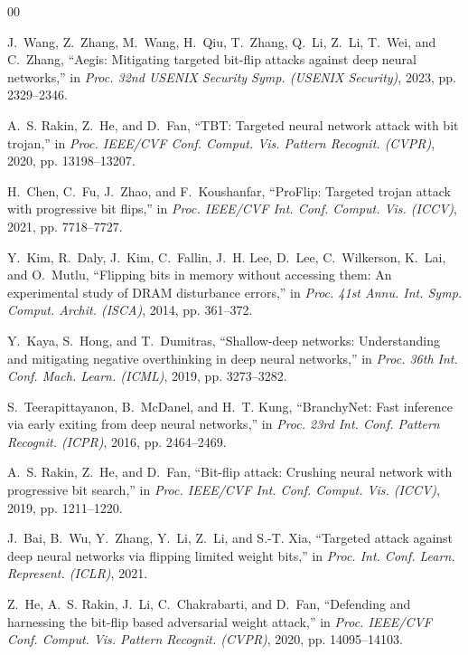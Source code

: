 \documentclass[conference,10pt]{IEEEtran}
\begin{document}
\begin{thebibliography}{00}

J.~Wang, Z.~Zhang, M.~Wang, H.~Qiu, T.~Zhang, Q.~Li, Z.~Li, T.~Wei, and C.~Zhang, ``Aegis: Mitigating targeted bit-flip attacks against deep neural networks,'' in \textit{Proc. 32nd USENIX Security Symp. (USENIX Security)}, 2023, pp. 2329--2346.

A.~S. Rakin, Z.~He, and D.~Fan, ``TBT: Targeted neural network attack with bit trojan,'' in \textit{Proc. IEEE/CVF Conf. Comput. Vis. Pattern Recognit. (CVPR)}, 2020, pp. 13198--13207.

H.~Chen, C.~Fu, J.~Zhao, and F.~Koushanfar, ``ProFlip: Targeted trojan attack with progressive bit flips,'' in \textit{Proc. IEEE/CVF Int. Conf. Comput. Vis. (ICCV)}, 2021, pp. 7718--7727.

Y.~Kim, R.~Daly, J.~Kim, C.~Fallin, J.~H. Lee, D.~Lee, C.~Wilkerson, K.~Lai, and O.~Mutlu, ``Flipping bits in memory without accessing them: An experimental study of DRAM disturbance errors,'' in \textit{Proc. 41st Annu. Int. Symp. Comput. Archit. (ISCA)}, 2014, pp. 361--372.

Y.~Kaya, S.~Hong, and T.~Dumitras, ``Shallow-deep networks: Understanding and mitigating negative overthinking in deep neural networks,'' in \textit{Proc. 36th Int. Conf. Mach. Learn. (ICML)}, 2019, pp. 3273--3282.

S.~Teerapittayanon, B.~McDanel, and H.~T. Kung, ``BranchyNet: Fast inference via early exiting from deep neural networks,'' in \textit{Proc. 23rd Int. Conf. Pattern Recognit. (ICPR)}, 2016, pp. 2464--2469.

A.~S. Rakin, Z.~He, and D.~Fan, ``Bit-flip attack: Crushing neural network with progressive bit search,'' in \textit{Proc. IEEE/CVF Int. Conf. Comput. Vis. (ICCV)}, 2019, pp. 1211--1220.

J.~Bai, B.~Wu, Y.~Zhang, Y.~Li, Z.~Li, and S.-T. Xia, ``Targeted attack against deep neural networks via flipping limited weight bits,'' in \textit{Proc. Int. Conf. Learn. Represent. (ICLR)}, 2021.

Z.~He, A.~S. Rakin, J.~Li, C.~Chakrabarti, and D.~Fan, ``Defending and harnessing the bit-flip based adversarial weight attack,'' in \textit{Proc. IEEE/CVF Conf. Comput. Vis. Pattern Recognit. (CVPR)}, 2020, pp. 14095--14103.


\end{thebibliography}
\end{document}
